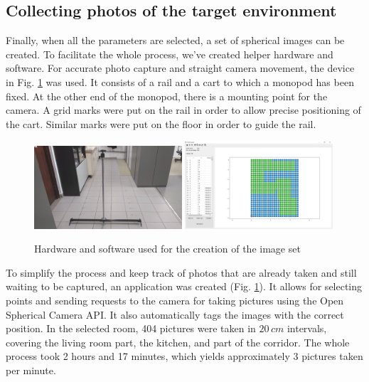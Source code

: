 \documentclass{svproc}
\begin{document}
\subsection{Collecting photos of the target environment}

Finally, when all the parameters are selected, a set of spherical images can be created.
To facilitate the whole process, we've created helper hardware and software.
For accurate photo capture and straight camera movement, the device in Fig. \ref{fig:rig} was used.
It consists of a rail and a cart to which a monopod has been fixed.
At the other end of the monopod, there is a mounting point for the camera.
A grid marks were put on the rail in order to allow precise positioning of the cart.
Similar marks were put on the floor in order to guide the rail.


\begin{figure}[!ht]
    \centering
    \includegraphics[width=0.49\textwidth]{img/rig/calosc.jpg}\hfill%
    \includegraphics[width=0.49\textwidth]{img/creator.png}\\
    \caption{Hardware and software used for the creation of the image set}
    \label{fig:rig}
\end{figure}

To simplify the process and keep track of photos that are already taken and still waiting to 
be captured, an application was created (Fig. \ref{fig:rig}).
It allows for selecting points and sending requests to the camera for taking pictures using the
Open Spherical Camera API. It also automatically tags the images with the correct position.
In the selected room, 404 pictures were taken in $20\,cm$ intervals, covering the living room part,
the kitchen, and part of the corridor. The whole process took 2 hours and 17 minutes,
which yields approximately 3 pictures taken per minute. 
\end{document}

